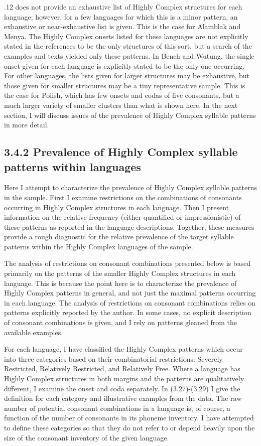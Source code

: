   .12 does not provide an exhaustive list of Highly Complex structures for each language; however, for a few languages for which this is a minor pattern, an exhaustive or near-exhaustive list is given. This is the case for Alamblak and Menya. The Highly Complex onsets listed for these languages are not explicitly stated in the references to be the only structures of this sort, but a search of the examples and texts yielded only these patterns. In Bench and Wutung, the single onset given for each language is explicitly stated to be the only one occurring. For other languages, the lists given for larger structures may be exhaustive, but those given for smaller structures may be a tiny representative sample. This is the case for Polish, which has few onsets and codas of five consonants, but a much larger variety of smaller clusters than what is shown here. In the next section, I will discuss issues of the prevalence of Highly Complex syllable patterns in more detail.

\subsection{3.4.2 Prevalence of Highly Complex syllable patterns within languages}

  Here I attempt to characterize the prevalence of Highly Complex syllable patterns in the sample. First I examine restrictions on the combinations of consonants occurring in Highly Complex structures in each language. Then I present information on the relative frequency (either quantified or impressionistic) of these patterns as reported in the language descriptions. Together, these measures provide a rough diagnostic for the relative prevalence of the target syllable patterns within the Highly Complex languages of the sample.

  The analysis of restrictions on consonant combinations presented below is based primarily on the patterns of the smaller Highly Complex structures in each language. This is because the point here is to characterize the prevalence of Highly Complex patterns in general, and not just the maximal patterns occurring in each language. The analysis of restrictions on consonant combinations relies on patterns explicitly reported by the author. In some cases, no explicit description of consonant combinations is given, and I rely on patterns gleaned from the available examples. 

  For each language, I have classified the Highly Complex patterns which occur into three categories based on their combinatorial restrictions: Severely Restricted, Relatively Restricted, and Relatively Free. Where a language has Highly Complex structures in both margins and the patterns are qualitatively different, I examine the onset and coda separately. In (3.27)-(3.29) I give the definition for each category and illustrative examples from the data. The raw number of potential consonant combinations in a language is, of course, a function of the number of consonants in its phoneme inventory. I have attempted to define these categories so that they do not refer to or depend heavily upon the size of the consonant inventory of the given language.

